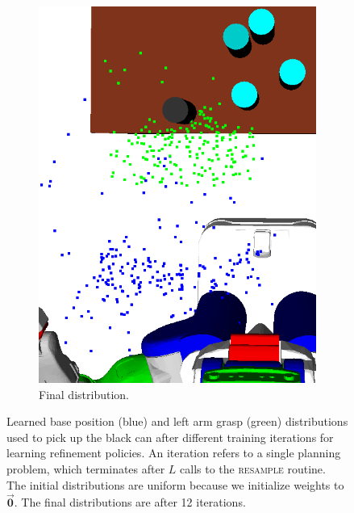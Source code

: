 \begin{figure}[t]
\begin{subfigure}[b]{0.35\linewidth}
    \includegraphics[width=\textwidth]{images/learn12.png}
    \caption{Final distribution.}
  \end{subfigure}
  \caption{\small{Learned base position (blue) and left arm grasp (green) distributions used to
pick up the black can after different training iterations for learning refinement policies.
An iteration refers to a single planning problem,
which terminates after $L$ calls to the \textsc{resample} routine. The
initial distributions are uniform because we initialize weights to $\vec{\mathbf{0}}$.
The final distributions are after 12 iterations.}}
  \label{fig:training}
  \vspace{-1.5 em}
\end{figure}

